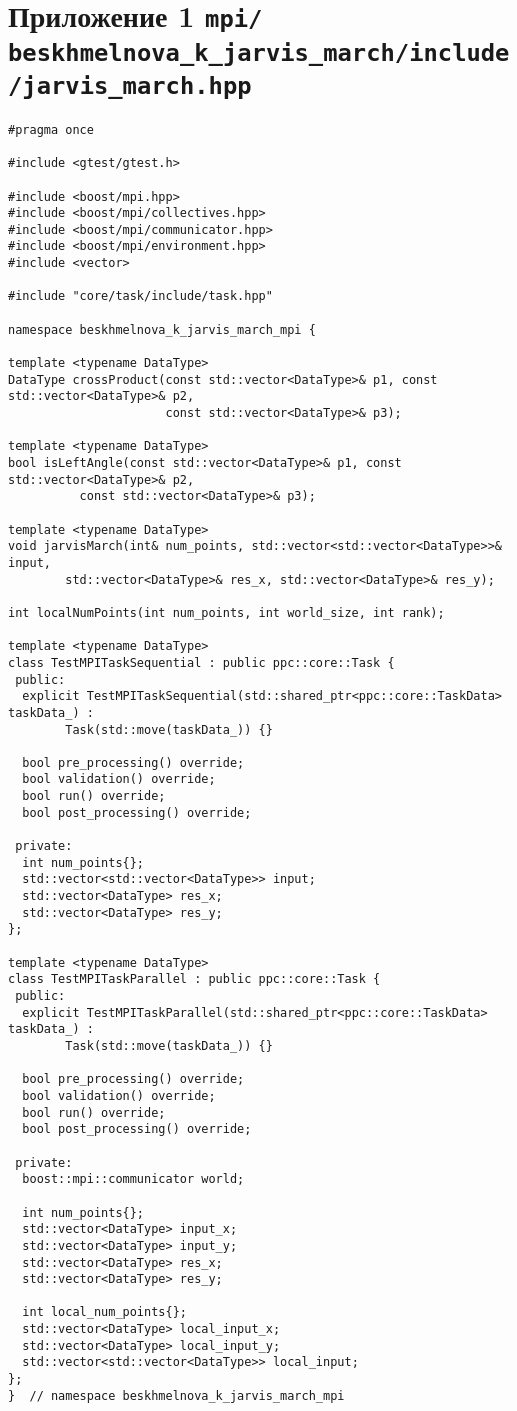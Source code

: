\documentclass[a4paper,12pt]{article}
\begin{document}
\newpage

\section{Приложение 1 \texttt{mpi/ beskhmelnova\_k\_jarvis\_march/include/jarvis\_march.hpp}}
{\footnotesize
\begin{lstlisting}
#pragma once

#include <gtest/gtest.h>

#include <boost/mpi.hpp>
#include <boost/mpi/collectives.hpp>
#include <boost/mpi/communicator.hpp>
#include <boost/mpi/environment.hpp>
#include <vector>

#include "core/task/include/task.hpp"

namespace beskhmelnova_k_jarvis_march_mpi {

template <typename DataType>
DataType crossProduct(const std::vector<DataType>& p1, const std::vector<DataType>& p2,
                      const std::vector<DataType>& p3);

template <typename DataType>
bool isLeftAngle(const std::vector<DataType>& p1, const std::vector<DataType>& p2, 
		  const std::vector<DataType>& p3);

template <typename DataType>
void jarvisMarch(int& num_points, std::vector<std::vector<DataType>>& input, 
		std::vector<DataType>& res_x, std::vector<DataType>& res_y);

int localNumPoints(int num_points, int world_size, int rank);

template <typename DataType>
class TestMPITaskSequential : public ppc::core::Task {
 public:
  explicit TestMPITaskSequential(std::shared_ptr<ppc::core::TaskData> taskData_) : 
		Task(std::move(taskData_)) {}

  bool pre_processing() override;
  bool validation() override;
  bool run() override;
  bool post_processing() override;

 private:
  int num_points{};
  std::vector<std::vector<DataType>> input;
  std::vector<DataType> res_x;
  std::vector<DataType> res_y;
};

template <typename DataType>
class TestMPITaskParallel : public ppc::core::Task {
 public:
  explicit TestMPITaskParallel(std::shared_ptr<ppc::core::TaskData> taskData_) : 
		Task(std::move(taskData_)) {}

  bool pre_processing() override;
  bool validation() override;
  bool run() override;
  bool post_processing() override;

 private:
  boost::mpi::communicator world;

  int num_points{};
  std::vector<DataType> input_x;
  std::vector<DataType> input_y;
  std::vector<DataType> res_x;
  std::vector<DataType> res_y;

  int local_num_points{};
  std::vector<DataType> local_input_x;
  std::vector<DataType> local_input_y;
  std::vector<std::vector<DataType>> local_input;
};
}  // namespace beskhmelnova_k_jarvis_march_mpi
\end{lstlisting}
}	
\end{document}
